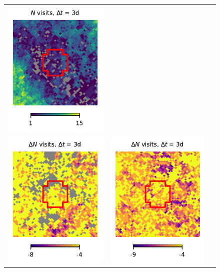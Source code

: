 \documentclass[preprintm,linenumbers]{aastex631}
\begin{document}
\begin{figure}
\begin{tabular}{  c c c}
				\includegraphics{results/skymaps_cutout/skymaps_cutout_first_year_one_snap_v4_0_10yrs_db_noDD_noTwi_tscale-3_nside-256_doAllTemplateMetrics_reduceCount_r_GP_noDD_noTwi.pdf} \\
				\includegraphics{results/skymaps_cutout/skymaps_cutout_delta_first_year_one_snap_v4_0_10yrs_db_noDD_noTwi_tscale-3_nside-256_doAllTemplateMetrics_reduceCount_r_NES_noDD_noTwi.pdf} &
				\includegraphics{results/skymaps_cutout/skymaps_cutout_delta_first_year_one_snap_v4_0_10yrs_db_noDD_noTwi_tscale-3_nside-256_doAllTemplateMetrics_reduceCount_r_WFD_noDD_noTwi.pdf} &

\end{tabular}
\end{figure}
\end{document}
